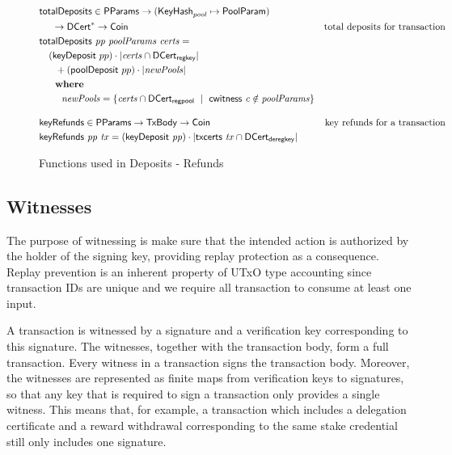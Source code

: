 \begin{figure}[htb]
  \begin{align*}
    & \fun{totalDeposits} \in \PParams \to (\KeyHash_{pool}\mapsto\PoolParam) \\
    & ~~~~\to \seqof{\DCert} \to \Coin
    & \text{total deposits for transaction} \\
    & \totalDeposits{pp}{poolParams}{certs} = \\
    &  ~~~ (\fun{keyDeposit}~pp)\cdot|\var{certs}\cap\DCertRegKey| \\
    &  ~~~~~ + (\fun{poolDeposit}~pp)\cdot|\var{newPools}| \\
    & ~~~\where \\
    &  ~~~~~~~ \var{newPools} = \{\var{certs}\cap\DCertRegPool ~\mid~ \cwitness{c}\notin \var{poolParams}\}
    \nextdef
      & \fun{keyRefunds} \in \PParams \to \TxBody \to \Coin
      & \text{key refunds for a transaction} \\
      & \keyRefunds{pp}{tx} = (\fun{keyDeposit}~\var{pp})\cdot|\txcerts{tx} \cap \DCertDeRegKey|\\
      \end{align*}
      \caption{Functions used in Deposits - Refunds}
      \label{fig:functions:deposits-refunds}
  \end{figure}

\clearpage

\subsection{Witnesses}
\label{sec:witnesses-sophie}

The purpose of witnessing is make sure that the intended action is authorized by
the holder of the signing key, providing replay protection as a consequence.
Replay prevention is an inherent property of UTxO type accounting
since transaction IDs are unique and we require all transaction to
consume at least one input.

A transaction is witnessed by a signature and a verification key corresponding
to this signature.  The witnesses, together with the transaction body, form a
full transaction.  Every witness in a transaction signs the transaction body.
Moreover, the witnesses are represented as finite maps from verification keys to
signatures, so that any key that is required to sign a transaction only provides
a single witness.  This means that, for example, a transaction which includes a
delegation certificate and a reward withdrawal corresponding to the same stake
credential still only includes one signature.

